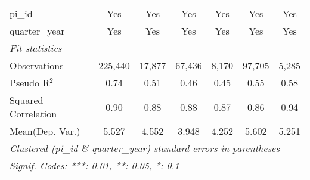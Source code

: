 \begin{tabular}{lcccccc}
   pi\_id                                                     & Yes           & Yes          & Yes           & Yes           & Yes           & Yes\\  
   quarter\_year                                              & Yes           & Yes          & Yes           & Yes           & Yes           & Yes\\  
   \midrule
   \emph{Fit statistics}\\
   Observations                                               & 225,440       & 17,877       & 67,436        & 8,170         & 97,705        & 5,285\\  
   Pseudo R$^2$                                               & 0.74          & 0.51         & 0.46          & 0.45          & 0.55          & 0.58\\  
   Squared Correlation                                        & 0.90          & 0.88         & 0.88          & 0.87          & 0.86          & 0.94\\  
Mean(Dep. Var.) & 5.527 & 4.552 & 3.948 & 4.252 & 5.602 & 5.251 \\
   \midrule \midrule
   \multicolumn{7}{l}{\emph{Clustered (pi\_id \& quarter\_year) standard-errors in parentheses}}\\
   \multicolumn{7}{l}{\emph{Signif. Codes: ***: 0.01, **: 0.05, *: 0.1}}\\
\end{tabular}
\par\endgroup
